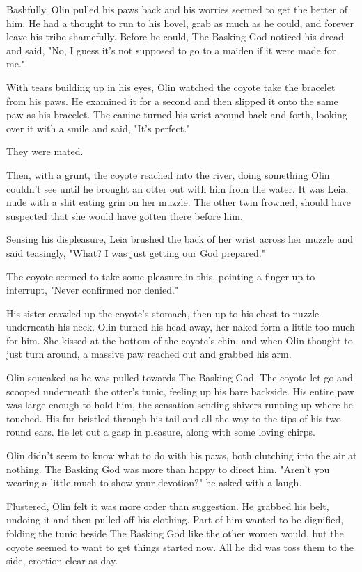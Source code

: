 Bashfully, Olin pulled his paws back and his worries seemed to get the better of him. He had a thought to run to his hovel, grab as much as he could, and forever leave his tribe shamefully. Before he could, The Basking God noticed his dread and said, "No, I guess it's not supposed to go to a maiden if it were made for me."

With tears building up in his eyes, Olin watched the coyote take the bracelet from his paws. He examined it for a second and then slipped it onto the same paw as his bracelet. The canine turned his wrist around back and forth, looking over it with a smile and said, "It's perfect."

They were mated.

Then, with a grunt, the coyote reached into the river, doing something Olin couldn't see until he brought an otter out with him from the water. It was Leia, nude with a shit eating grin on her muzzle. The other twin frowned, should have suspected that she would have gotten there before him.

Sensing his displeasure, Leia brushed the back of her wrist across her muzzle and said teasingly, "What? I was just getting our God prepared."

The coyote seemed to take some pleasure in this, pointing a finger up to interrupt, "Never confirmed nor denied."

His sister crawled up the coyote's stomach, then up to his chest to nuzzle underneath his neck. Olin turned his head away, her naked form a little too much for him. She kissed at the bottom of the coyote's chin, and when Olin thought to just turn around, a massive paw reached out and grabbed his arm.

Olin squeaked as he was pulled towards The Basking God. The coyote let go and scooped underneath the otter's tunic, feeling up his bare backside. His entire paw was large enough to hold him, the sensation sending shivers running up where he touched. His fur bristled through his tail and all the way to the tips of his two round ears. He let out a gasp in pleasure, along with some loving chirps.

Olin didn't seem to know what to do with his paws, both clutching into the air at nothing. The Basking God was more than happy to direct him. "Aren't you wearing a little much to show your devotion?" he asked with a laugh.

Flustered, Olin felt it was more order than suggestion. He grabbed his belt, undoing it and then pulled off his clothing. Part of him wanted to be dignified, folding the tunic beside The Basking God like the other women would, but the coyote seemed to want to get things started now. All he did was toss them to the side, erection clear as day.

